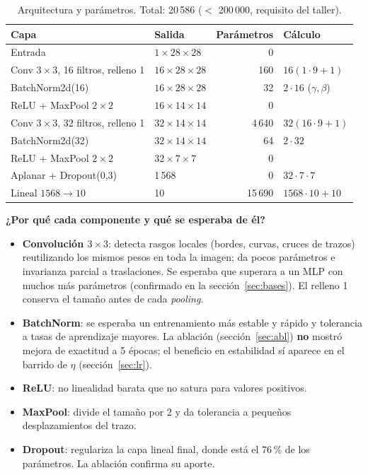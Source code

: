 \documentclass[11pt,letterpaper]{article}
\begin{document}
\begin{table}[!htbp]
\centering\footnotesize
\caption{Arquitectura y parámetros. Total: 20\,586 ($<$ 200\,000, requisito del taller).}
\begin{tabular}{l l r l}
\toprule
Capa & Salida & Parámetros & Cálculo \\
\midrule
Entrada & $1\times28\times28$ & 0 & \\
Conv $3\times3$, 16 filtros, relleno 1 & $16\times28\times28$ & 160 & $16(1\cdot9+1)$ \\
BatchNorm2d(16) & $16\times28\times28$ & 32 & $2\cdot16$ ($\gamma,\beta$) \\
ReLU + MaxPool $2\times2$ & $16\times14\times14$ & 0 & \\
Conv $3\times3$, 32 filtros, relleno 1 & $32\times14\times14$ & 4\,640 & $32(16\cdot9+1)$ \\
BatchNorm2d(32) & $32\times14\times14$ & 64 & $2\cdot32$ \\
ReLU + MaxPool $2\times2$ & $32\times7\times7$ & 0 & \\
Aplanar + Dropout(0,3) & 1\,568 & 0 & $32\cdot7\cdot7$ \\
Lineal $1568\to10$ & 10 & 15\,690 & $1568\cdot10+10$ \\
\bottomrule
\end{tabular}
\end{table}

\textbf{¿Por qué cada componente y qué se esperaba de él?}
\begin{itemize}
  \item \textbf{Convolución $3\times3$}: detecta rasgos locales (bordes, curvas, cruces de trazos) reutilizando los mismos pesos en toda
        la imagen; da pocos parámetros e invarianza parcial a traslaciones. Se esperaba que superara a un MLP con muchos más parámetros
        (confirmado en la sección~\ref{sec:bases}). El relleno 1 conserva el tamaño antes de cada \textit{pooling}.
  \item \textbf{BatchNorm}: se esperaba un entrenamiento más estable y rápido y tolerancia a tasas de aprendizaje mayores. La ablación
        (sección~\ref{sec:abl}) \textbf{no} mostró mejora de exactitud a 5 épocas; el beneficio en estabilidad sí aparece en el barrido de $\eta$
        (sección~\ref{sec:lr}).
  \item \textbf{ReLU}: no linealidad barata que no satura para valores positivos.
  \item \textbf{MaxPool}: divide el tamaño por 2 y da tolerancia a pequeños desplazamientos del trazo.
  \item \textbf{Dropout}: regulariza la capa lineal final, donde está el 76\,\% de los parámetros. La ablación confirma su aporte.
\end{itemize}
\end{document}
